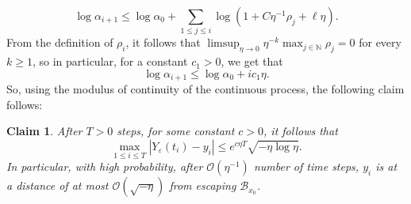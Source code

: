 \documentclass{amsproc}
\newtheorem{claim}[theorem]{Claim}
\newcommand{\eps}{\varepsilon}
\newcommand{\y}{Y_\eps}
\begin{document}
\[
\log \alpha_{i+1} \leq \log \alpha_0 + \sum_{ 1 \leq j \leq i } \log \left(  1 + C \eta^{-1} \rho_j + \ell \eta  \right ).
\]
From the definition of $\rho_i$, it follows that $\limsup_{\eta \to 0 } \eta^{-k} \max_{ j \in \mathbb{N} } \rho_j = 0 $ for every $k\geq 1$, so in particular, for a constant $c_1>0$, we get that 
\[
\log \alpha_{i+1} \leq \log \alpha_0 + i c_1 \eta.
\]
So, using the modulus of continuity of the continuous process, the following claim follows:
\begin{claim}
After $T>0$ steps, for some constant $c>0$, it follows that 
\[
\max_{ 1 \leq i \leq T } \left \vert \y(t_i) - y_i \right \vert \leq e^{c\eta T } \sqrt{ -\eta \log \eta }.
\]
In particular, with high probability, after $\mathcal{O}(\eta^{-1})$ number of time steps, $y_i$ is at a distance of at most $\mathcal{O}(\sqrt{-\eta})$ from escaping $\mathcal{B}_{x_0}$.
\end{claim}
\end{document}
